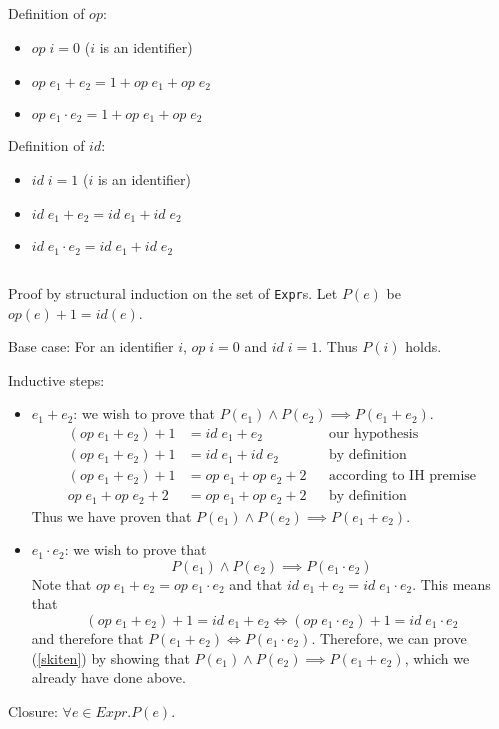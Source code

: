 \documentclass{article}
\begin{document}
\subsection{}
Definition of $op$:
\begin{itemize}
\item $op\;i = 0$ ($i$ is an identifier)
\item $op\;e_1 + e_2 = 1 + op\;e_1 + op\;e_2$
\item $op\;e_1 \cdot e_2 = 1 + op\;e_1 + op\;e_2$
\end{itemize}
Definition of $id$:
\begin{itemize}
\item $id\;i = 1$ ($i$ is an identifier)
\item $id\;e_1 + e_2 = id\;e_1 + id\;e_2$
\item $id\;e_1 \cdot e_2 = id\;e_1 + id\;e_2$
\end{itemize}
\subsection{}
Proof by structural induction on the set of \texttt{Expr}s. Let $P(e)$ be $op(e) + 1 = id(e)$.

Base case:
For an identifier $i$, $op\;i = 0$ and $id\;i = 1$. Thus $P(i)$ holds.

Inductive steps:
\begin{itemize}
\item $e_1 + e_2$: we wish to prove that $P(e_1) \land P(e_2) \implies P(e_1 + e_2)$.
\begin{align*}
(op\;e_1+e_2) + 1 &= id\;e_1+e_2 && \text{our hypothesis} \\
(op\;e_1+e_2) + 1 &= id\;e_1 + id\;e_2 && \text{by definition} \\
(op\;e_1+e_2) + 1 &= op\;e_1 + op\;e_2 + 2 && \text{according to IH premise} \\
op\;e_1 + op\;e_2 + 2 &= op\;e_1 + op\;e_2 + 2 && \text{by definition}
\end{align*}
Thus we have proven that $P(e_1) \land P(e_2) \implies P(e_1 + e_2)$.
\item $e_1 \cdot e_2$: we wish to prove that
\begin{equation}
\label{skiten}
P(e_1) \land P(e_2) \implies P(e_1 \cdot e_2)
\end{equation}
Note that $op\;e_1+e_2 = op\;e_1\cdot e_2$ and that $id\;e_1+e_2 = id\;e_1 \cdot e_2$. This means that
\[ (op\;e_1+e_2)+1 = id\;e_1 + e_2 \iff (op\;e_1\cdot e_2)+1 = id\;e_1 \cdot e_2 \]
and therefore that $P(e_1+e_2) \iff P(e_1 \cdot e_2)$. Therefore, we can prove (\ref{skiten}) by showing that $P(e_1) \land P(e_2) \implies P(e_1 + e_2)$, which we already have done above.
\end{itemize}
Closure: $\forall e \in Expr. P(e)$.
\newpage
\end{document}
